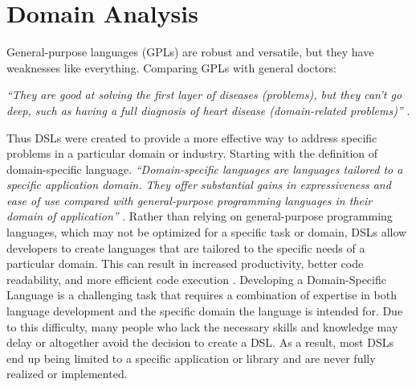 \chapter{Domain Analysis}
General-purpose languages (GPLs) are robust and versatile, but they have weaknesses like everything. Comparing GPLs with general doctors:

\emph{“They are good at solving the first layer of diseases (problems), but they can’t go deep, such as having a full diagnosis of heart disease (domain-related problems)”} \cite{alves}.

Thus DSLs were created to provide a more effective way to address specific problems in a particular domain or industry. Starting with the definition of domain-specific language. \emph{“Domain-specific languages are languages tailored to a specific application domain. They offer substantial gains in expressiveness and ease of use compared with general-purpose programming languages in their domain of application”} \cite{mernik}.
Rather than relying on general-purpose programming languages, which may not be optimized for a specific task or domain, DSLs allow developers to create languages that are tailored to the specific needs of a particular domain. This can result in increased productivity, better code readability, and more efficient code execution \cite{jetbrains}.
Developing a Domain-Specific Language is a challenging task that requires a combination of expertise in both language development and the specific domain the language is intended for. Due to this difficulty, many people who lack the necessary skills and knowledge may delay or altogether avoid the decision to create a DSL. As a result, most DSLs end up being limited to a specific application or library and are never fully realized or implemented. \par




\vspace{0.5cm}
